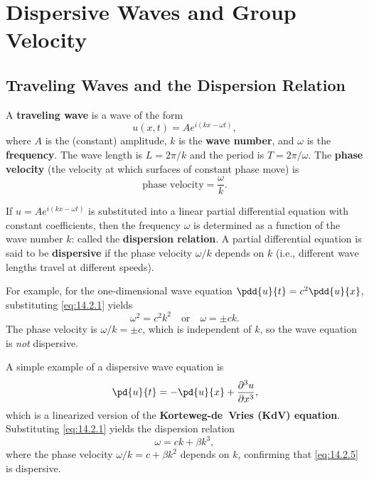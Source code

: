 \section{Dispersive Waves and Group Velocity}
\label{sec:dispersive-group-velocity}

\subsection{Traveling Waves and the Dispersion Relation}
\label{sec:traveling-waves-dispersion}

A \textbf{traveling wave} is a wave of the form
\begin{equation}
\label{eq:14.2.1}
u(x,t) = A e^{i(kx - \omega t)},
\end{equation}
where $A$ is the (constant) amplitude, $k$ is the \textbf{wave number}, and $\omega$ is the \textbf{frequency}.  The wave length is $L = 2\pi/k$ and the period is $T = 2\pi/\omega$.  The \textbf{phase velocity} (the velocity at which surfaces of constant phase move) is
\begin{equation}
\label{eq:14.2.2}
\text{phase velocity} = \frac{\omega}{k}.
\end{equation}

If $u = Ae^{i(kx - \omega t)}$ is substituted into a linear partial differential equation with constant coefficients, then the frequency $\omega$ is determined as a function of the wave number $k$:
called the \textbf{dispersion relation}.  A partial differential equation is said to be \textbf{dispersive} if the phase velocity $\omega/k$ depends on $k$ (i.e., different wave lengths travel at different speeds).

For example, for the one-dimensional wave equation $\pdd{u}{t} = c^2\pdd{u}{x}$, substituting \eqref{eq:14.2.1} yields
\begin{equation}
\label{eq:14.2.4}
\omega^2 = c^2 k^2 \quad \text{or} \quad \omega = \pm ck.
\end{equation}
The phase velocity is $\omega/k = \pm c$, which is independent of $k$, so the wave equation is \emph{not} dispersive.

A simple example of a dispersive wave equation is
\begin{equation}
\label{eq:14.2.5}
\pd{u}{t} = -\pd{u}{x} + \frac{\partial^3 u}{\partial x^3},
\end{equation}
which is a linearized version of the \textbf{Korteweg-de~Vries (KdV) equation}.  Substituting \eqref{eq:14.2.1} yields the dispersion relation
\begin{equation}
\label{eq:14.2.6}
\omega = ck + \beta k^3,
\end{equation}
where the phase velocity $\omega/k = c + \beta k^2$ depends on $k$, confirming that \eqref{eq:14.2.5} is dispersive.

